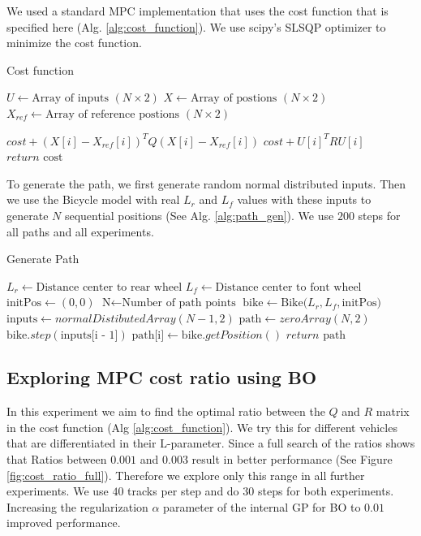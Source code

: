 \documentclass[twoside,twocolumn]{article}
\begin{document}
We used a standard MPC implementation that uses the cost function that is specified here (Alg. \ref{alg:cost_function}). We use scipy's SLSQP optimizer to minimize the cost function.
\begin{algorithm}
    \caption{Cost function}
    \label{alg:cost_function}
    \begin{algorithmic}
        \State $U \gets \text{Array of inputs } (N \times 2)$
        \State $X \gets \text{Array of postions } (N \times 2)$
        \State $X_{ref} \gets \text{Array of reference postions } (N \times 2)$

            \State $cost + (X[i] - X_{ref}[i])^T Q (X[i] - X_{ref}[i])$
            \State $cost + U[i]^T R U[i]$
        \EndFor
        \State $return \text{ cost}$
    \end{algorithmic}
\end{algorithm}

To generate the path, we first generate random normal distributed inputs. Then we use the Bicycle model with real $L_r$ and $L_f$ values with these inputs to generate $N$ sequential positions (See Alg. \ref{alg:path_gen}). We use $200$ steps for all paths and all experiments.
\begin{algorithm}
    \caption{Generate Path}
    \label{alg:path_gen}
    \begin{algorithmic}
        \State $L_r \gets \text{Distance center to rear wheel}$
        \State $L_f \gets \text{Distance center to font wheel}$
        \State $\text{initPos} \gets (0,0)$
        \State $\text{N} \gets \text{Number of path points}$
        \State $\text{bike} \gets \text{Bike(}L_r, L_f, \text{initPos}\text{)}$
        \State $\text{inputs} \gets normalDistibutedArray(N - 1, 2)$
        \State $\text{path} \gets zeroArray(N, 2)$
            \State $\text{bike}.step(\text{inputs[i - 1]})$
            \State $\text{path[i]} \gets \text{bike}.getPosition()$
        \EndFor
        \State $return \text{ path}$
    \end{algorithmic}
\end{algorithm}

\subsection{Exploring MPC cost ratio using BO}

In this experiment we aim to find the optimal ratio between the $Q$ and $R$ matrix in the cost function (Alg \ref{alg:cost_function}). We try this for different vehicles that are differentiated in their L-parameter. Since a full search of the ratios shows that Ratios between $0.001$ and $0.003$ result in better performance (See Figure \ref{fig:cost_ratio_full}). Therefore we explore only this range in all further experiments. We use $40$ tracks per step and do $30$ steps for both experiments. Increasing the regularization $\alpha$ parameter of the internal GP for BO to $0.01$ improved performance.
\end{document}
